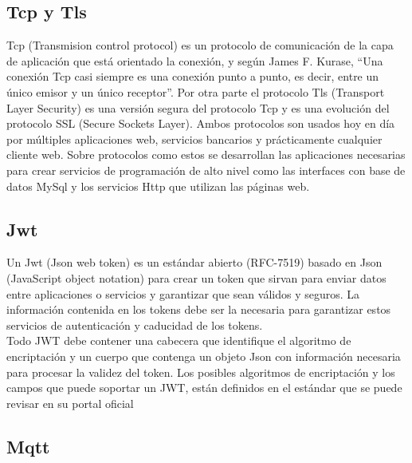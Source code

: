 \subsection{Tcp y Tls}

Tcp (Transmision control protocol) es un protocolo de comunicación de la capa de aplicación que está orientado la conexión, y según James F. Kurase, ``Una conexión Tcp casi siempre es una conexión punto a punto, es decir, entre un único emisor y un único receptor''\cite{KuroseJ.F.&Ross2010}. Por otra parte el protocolo Tls  (Transport Layer Security) es una versión segura del protocolo Tcp y es una evolución del protocolo SSL (Secure Sockets Layer). Ambos protocolos son usados hoy en día por múltiples aplicaciones web, servicios bancarios y prácticamente cualquier cliente web. Sobre protocolos como estos se desarrollan las aplicaciones necesarias para crear servicios de programación de alto nivel como las interfaces con base de datos MySql y los servicios Http que utilizan las páginas web.

\subsection{Jwt}
Un Jwt (Json web token) es un estándar abierto (RFC-7519) basado en Json (JavaScript object notation) para crear un token que sirvan para enviar datos entre aplicaciones o servicios y garantizar que sean válidos y seguros. La información contenida en los tokens debe ser la necesaria para garantizar estos servicios de autenticación y caducidad de los tokens.
\vspace{0.5cm}\\
Todo JWT debe contener una cabecera que identifique el algoritmo de encriptación y un cuerpo que contenga un objeto Json con información necesaria para procesar la validez del token. Los posibles algoritmos de encriptación y los campos que puede soportar un JWT, están definidos en el estándar que se puede revisar en su portal oficial \cite{jwtio}

\subsection{Mqtt}

